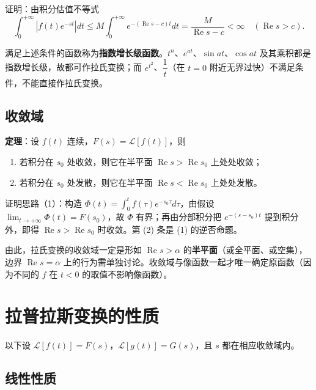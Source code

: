 证明：由积分估值不等式
\[
\int_0^{+\infty}\left|f(t)e^{-st}\right|dt
\le M\int_0^{+\infty}e^{-(\operatorname{Re}s-c)t}dt
=\frac{M}{\operatorname{Re}s-c}<\infty\quad(\operatorname{Re}s>c).
\]

满足上述条件的函数称为\textbf{指数增长级函数}。\(t^n\)、\(e^{at}\)、\(\sin at\)、\(\cos at\) 及其乘积都是指数增长级，故都可作拉氏变换；而 \(e^{t^2}\)、\(\dfrac{1}{t}\)（在 \(t=0\) 附近无界过快）不满足条件，不能直接作拉氏变换。

\subsection{收敛域}

\textbf{定理}：设 \(f(t)\) 连续，\(F(s)=\mathscr{L}[f(t)]\)，则
\begin{enumerate}[label=(\arabic*)]
    \item 若积分在 \(s_0\) 处收敛，则它在半平面 \(\operatorname{Re}s>\operatorname{Re}s_0\) 上处处收敛；
    \item 若积分在 \(s_0\) 处发散，则它在半平面 \(\operatorname{Re}s<\operatorname{Re}s_0\) 上处处发散。
\end{enumerate}

证明思路（1）：构造 \(\Phi(t)=\displaystyle\int_0^t f(\tau)e^{-s_0\tau}d\tau\)，由假设 \(\lim_{t\to+\infty}\Phi(t)=F(s_0)\)，故 \(\Phi\) 有界；再由分部积分把 \(e^{-(s-s_0)t}\) 提到积分外，即得 \(\operatorname{Re}s>\operatorname{Re}s_0\) 时收敛。第 (2) 条是 (1) 的逆否命题。

由此，拉氏变换的收敛域一定是形如 \(\operatorname{Re}s>\alpha\) 的\textbf{半平面}（或全平面、或空集），边界 \(\operatorname{Re}s=\alpha\) 上的行为需单独讨论。收敛域与像函数一起才唯一确定原函数（因为不同的 \(f\) 在 \(t<0\) 的取值不影响像函数）。


\section{拉普拉斯变换的性质}

以下设 \(\mathscr{L}[f(t)]=F(s)\)，\(\mathscr{L}[g(t)]=G(s)\)，且 \(s\) 都在相应收敛域内。

\subsection{线性性质}

